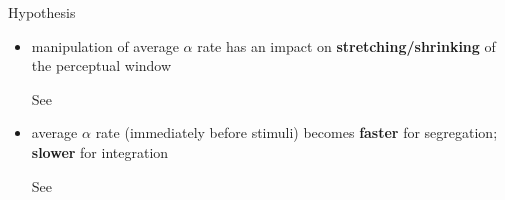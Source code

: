 \begin{frame}{{Hypothesis}}
{\begin{itemize}
            {\scriptsize See \citet{samaha2015speed,buergers2022role}}
            \item<11-> manipulation of average $\alpha$ rate has an impact on \textcolor{lightlavender}{\textbf{stretching/shrinking}} of the perceptual window
            
            {\scriptsize See \citet{cecere2015individual,minami2017illusory,ronconi2018alpha,mioni2020modulation}}
            \item<12-> average $\alpha$ rate (immediately before stimuli) becomes \textcolor{lightlavender}{\textbf{faster}} for segregation;  \textcolor{lightlavender}{\textbf{slower}} for integration
            
            {\scriptsize See \citet{wutz2018frequency}}
        \end{itemize}
    }

        
    \end{frame}

